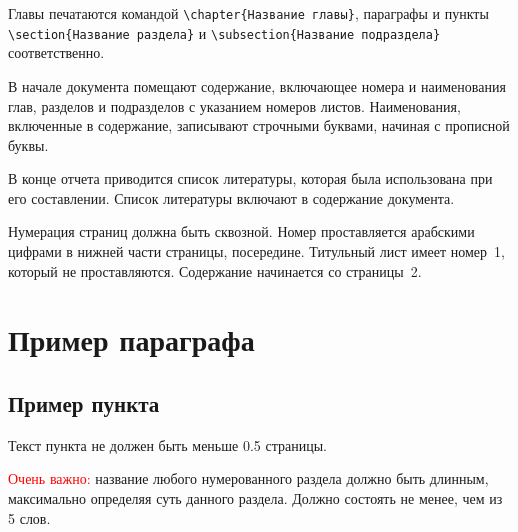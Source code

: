Главы печатаются командой \verb|\chapter{Название главы}|, параграфы и пункты
\verb|\section{Название раздела}| и \verb|\subsection{Название подраздела}|
соответственно.

В начале документа помещают содержание, включающее номера и наименования глав, 
разделов и подразделов с указанием номеров листов. Наименования, включенные в 
содержание, записывают строчными буквами, начиная с прописной буквы.

В конце отчета приводится список литературы, которая была использована 
при его составлении. Список литературы включают в содержание документа.

Нумерация страниц должна быть сквозной. Номер проставляется арабскими 
цифрами в нижней части страницы, посередине. Титульный лист имеет номер~1,
который не проставляются. Содержание начинается со страницы~2.

\section{Пример параграфа}

\subsection{Пример пункта}
Текст пункта не должен быть меньше 0.5 страницы.


\textcolor{red}{Очень важно:} название любого нумерованного раздела должно быть длинным, максимально определяя суть данного раздела. Должно состоять не менее, чем из 5 слов.





